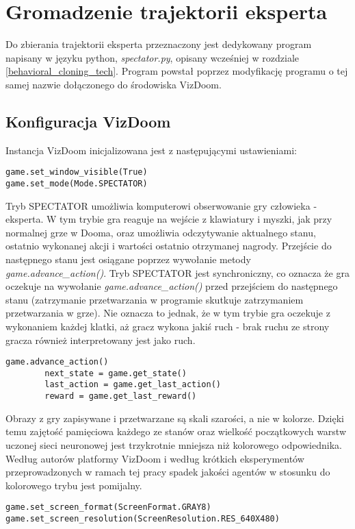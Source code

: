 \section{Gromadzenie trajektorii eksperta}

Do zbierania trajektorii eksperta przeznaczony jest dedykowany program napisany w języku python, \textit{spectator.py}, opisany wcześniej w rozdziale \ref{behavioral_cloning_tech}. Program powstał poprzez modyfikację programu o tej samej nazwie dołączonego do środowiska VizDoom.

\subsection{Konfiguracja VizDoom}
Instancja VizDoom inicjalizowana jest z następującymi ustawieniami:

\begin{lstlisting}[language=iPython]
game.set_window_visible(True)
game.set_mode(Mode.SPECTATOR)
\end{lstlisting}

Tryb SPECTATOR umożliwia komputerowi obserwowanie gry człowieka - eksperta. W tym trybie gra reaguje na wejście z klawiatury i myszki, jak przy normalnej grze w Dooma, oraz umożliwia odczytywanie aktualnego stanu, ostatnio wykonanej akcji i wartości ostatnio otrzymanej nagrody. Przejście do następnego stanu jest osiągane poprzez wywołanie metody \textit{game.advance\_action()}. Tryb SPECTATOR jest synchroniczny, co oznacza że gra oczekuje na wywołanie \textit{game.advance\_action()} przed przejściem do następnego stanu (zatrzymanie przetwarzania w programie skutkuje zatrzymaniem przetwarzania w grze). Nie oznacza to jednak, że w tym trybie gra oczekuje z wykonaniem każdej klatki, aż gracz wykona jakiś ruch - brak ruchu ze strony gracza również interpretowany jest jako ruch.

\begin{lstlisting}[language=iPython]
 	game.advance_action()
        next_state = game.get_state()
        last_action = game.get_last_action()
        reward = game.get_last_reward()
\end{lstlisting}

Obrazy z gry zapisywane i przetwarzane są skali szarości, a nie w kolorze. Dzięki temu zajętość pamięciowa każdego ze stanów oraz wielkość początkowych warstw uczonej sieci neuronowej jest trzykrotnie mniejsza niż kolorowego odpowiednika. Według autorów platformy VizDoom i według krótkich eksperymentów przeprowadzonych w ramach tej pracy spadek jakości agentów w stosunku do kolorowego trybu jest pomijalny.
\begin{lstlisting}[language=iPython]
game.set_screen_format(ScreenFormat.GRAY8)
game.set_screen_resolution(ScreenResolution.RES_640X480)
\end{lstlisting}

